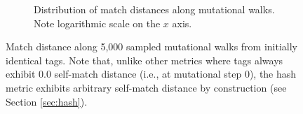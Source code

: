 \begin{figure}[!htbp]
\begin{center}
\begin{subfigure}[b]{\linewidth}
\begin{minipage}{\linewidth}
\end{minipage}
\begin{minipage}{\linewidth}
\caption{
Distribution of match distances along mutational walks.
Note logarithmic scale on the $x$ axis.
}
\end{minipage}
\end{subfigure}

\caption{
Match distance along 5,000 sampled mutational walks from initially identical tags.
Note that, unlike other metrics where tags always exhibit 0.0 self-match distance (i.e., at mutational step 0), the hash metric exhibits arbitrary self-match distance by construction (see Section \ref{sec:hash}).
}
\label{fig:mutational_walk_barplot}

\end{center}
\end{figure}
